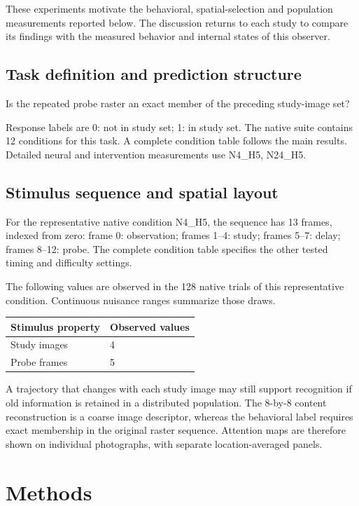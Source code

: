 \documentclass[11pt]{article}
\begin{document}
These experiments motivate the behavioral, spatial-selection and population measurements reported below. The discussion returns to each study to compare its findings with the measured behavior and internal states of this observer.
\subsection{Task definition and prediction structure}
Is the repeated probe raster an exact member of the preceding study-image set?

Response labels are 0: not in study set; 1: in study set. The native suite contains 12 conditions for this task. A complete condition table follows the main results. Detailed neural and intervention measurements use N4\_\allowbreak{}H5, N24\_\allowbreak{}H5.

\subsection{Stimulus sequence and spatial layout}
For the representative native condition N4\_\allowbreak{}H5, the sequence has 13 frames, indexed from zero: frame 0: observation; frames 1--4: study; frames 5--7: delay; frames 8--12: probe. The complete condition table specifies the other tested timing and difficulty settings.

The following values are observed in the 128 native trials of this representative condition. Continuous nuisance ranges summarize those draws.
\begin{center}\small\begin{tabular}{p{}p{}}\toprule Stimulus property & Observed values\\\midrule
Study images & 4\\
Probe frames & 5\\
\bottomrule\end{tabular}\normalsize\end{center}
A trajectory that changes with each study image may still support recognition if old information is retained in a distributed population. The 8-by-8 content reconstruction is a coarse image descriptor, whereas the behavioral label requires exact membership in the original raster sequence. Attention maps are therefore shown on individual photographs, with separate location-averaged panels.


\section{Methods}
\end{document}
